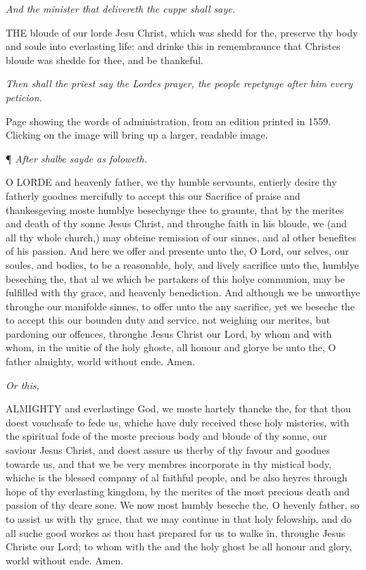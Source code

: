 \emph{And
the minister that delivereth the cuppe shall saye.}

THE
bloude of our lorde Jesu Christ, which was shedd for the, preserve thy
body and soule into everlasting life: and drinke this in remembraunce
that Christes bloude was shedde for thee, and be thankeful.

\emph{Then shall the priest say the Lordes prayer, the people repetynge after
him every peticion.}

Page
showing the words of administration, from an edition printed in 1559. Clicking
on the image will bring up a larger, readable image.

¶
\emph{After shalbe sayde as foloweth.}

O
LORDE and heavenly father, we thy humble servaunts, entierly desire thy
fatherly goodnes mercifully to accept this our Sacrifice of praise and
thankesgeving moste humblye besechynge thee to graunte, that by the merites
and death of thy sonne Jesus Christ, and throughe faith in his bloude,
we (and all thy whole church,) may obteine remission of our sinnes, and
al other benefites of his passion. And here we offer and presente unto
the, O Lord, our selves, our soules, and bodies, to be a reasonable, holy,
and lively sacrifice unto the, humblye beseching the, that al we which
be partakers of this holye communion, may be fulfilled with thy grace,
and heavenly benediction. And although we be unworthye throughe our manifolde
sinnes, to offer unto the any sacrifice, yet we beseche the to accept
this our bounden duty and service, not weighing our merites, but pardoning
our offences, throughe Jesus Christ our Lord, by whom and with whom, in
the unitie of the holy ghoste, all honour and glorye be unto the, O father
almighty, world without ende. Amen.

\emph{Or
this,}

ALMIGHTY
and everlastinge God, we moste hartely thancke the, for that thou doest
vouchsafe to fede us, whiche have duly received these holy misteries,
with the spiritual fode of the moste precious body and bloude of thy sonne,
our saviour Jesus Christ, and doest assure us therby of thy favour and
goodnes towarde us, and that we be very membres incorporate in thy mistical
body, whiche is the blessed company of al faithful people, and be also
heyres through hope of thy everlasting kingdom, by the merites of the
most precious death and passion of thy deare sone. We now most humbly
beseche the, O hevenly father, so to assist us with thy grace, that we
may continue in that holy felowship, and do all suche good workes as thou
hast prepared for us to walke in, throughe Jesus Christe our Lord; to
whom with the and the holy ghost be all honour and glory, world without
ende. Amen.


